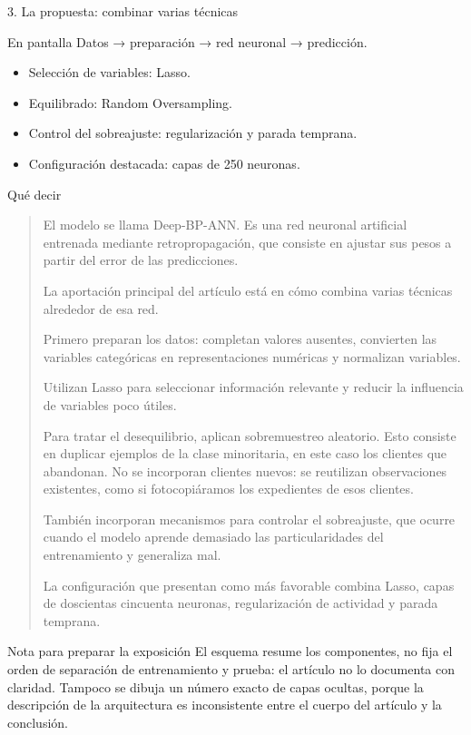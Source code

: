 \documentclass[presentation]{beamer}
\begin{document}
\begin{frame}[label={sec:orgf627b94}]{3. La propuesta: combinar varias técnicas}
\begin{block}{En pantalla}
Datos → preparación → red neuronal → predicción.

\begin{itemize}
\item Selección de variables: Lasso.
\item Equilibrado: Random Oversampling.
\item Control del sobreajuste: regularización y parada temprana.
\item Configuración destacada: capas de 250 neuronas.
\end{itemize}
\end{block}
\begin{block}{Qué decir}
\begin{quote}
El modelo se llama Deep-BP-ANN. Es una red neuronal artificial entrenada mediante retropropagación, que consiste en ajustar sus pesos a partir del error de las predicciones.

La aportación principal del artículo está en cómo combina varias técnicas alrededor de esa red.

Primero preparan los datos: completan valores ausentes, convierten las variables categóricas en representaciones numéricas y normalizan variables.

Utilizan Lasso para seleccionar información relevante y reducir la influencia de variables poco útiles.

Para tratar el desequilibrio, aplican sobremuestreo aleatorio. Esto consiste en duplicar ejemplos de la clase minoritaria, en este caso los clientes que abandonan. No se incorporan clientes nuevos: se reutilizan observaciones existentes, como si fotocopiáramos los expedientes de esos clientes.

También incorporan mecanismos para controlar el sobreajuste, que ocurre cuando el modelo aprende demasiado las particularidades del entrenamiento y generaliza mal.

La configuración que presentan como más favorable combina Lasso, capas de doscientas cincuenta neuronas, regularización de actividad y parada temprana.
\end{quote}
\end{block}
\begin{block}{Nota para preparar la exposición}
El esquema resume los componentes, no fija el orden de separación de entrenamiento y prueba: el artículo no lo documenta con claridad. Tampoco se dibuja un número exacto de capas ocultas, porque la descripción de la arquitectura es inconsistente entre el cuerpo del artículo y la conclusión.
\end{block}
\end{frame}
\end{document}
